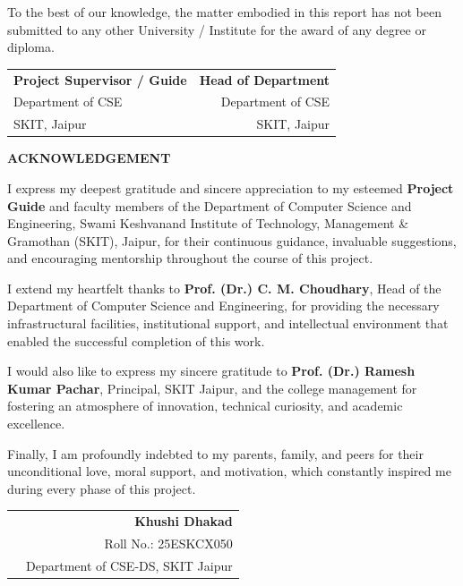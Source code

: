 \documentclass[12pt,a4paper]{report}
\begin{document}
To the best of our knowledge, the matter embodied in this report has not been submitted to any other University / Institute for the award of any degree or diploma.

\vspace{3.5cm}

\noindent
\begin{tabularx}{\textwidth}{Xr}
\textbf{Project Supervisor / Guide} & \textbf{Head of Department} \\
Department of CSE & Department of CSE \\
SKIT, Jaipur & SKIT, Jaipur \\
\end{tabularx}
\clearpage

\begin{center}
    {\LARGE \textbf{\textcolor{skitnavy}{ACKNOWLEDGEMENT}}}
\end{center}
\vspace{1.5cm}

I express my deepest gratitude and sincere appreciation to my esteemed \textbf{Project Guide} and faculty members of the Department of Computer Science and Engineering, Swami Keshvanand Institute of Technology, Management \& Gramothan (SKIT), Jaipur, for their continuous guidance, invaluable suggestions, and encouraging mentorship throughout the course of this project.

I extend my heartfelt thanks to \textbf{Prof. (Dr.) C. M. Choudhary}, Head of the Department of Computer Science and Engineering, for providing the necessary infrastructural facilities, institutional support, and intellectual environment that enabled the successful completion of this work.

I would also like to express my sincere gratitude to \textbf{Prof. (Dr.) Ramesh Kumar Pachar}, Principal, SKIT Jaipur, and the college management for fostering an atmosphere of innovation, technical curiosity, and academic excellence.

Finally, I am profoundly indebted to my parents, family, and peers for their unconditional love, moral support, and motivation, which constantly inspired me during every phase of this project.

\vspace{2.5cm}

\noindent
\begin{tabularx}{\textwidth}{Xr}
& \textbf{Khushi Dhakad} \\
& Roll No.: 25ESKCX050 \\
& Department of CSE-DS, SKIT Jaipur \\
\end{tabularx}
\clearpage
\end{document}
